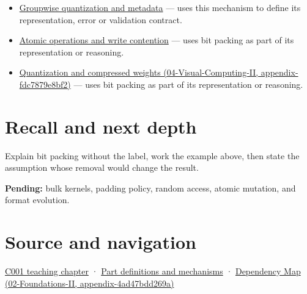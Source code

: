 \begin{itemize}
\item
  \hyperref[appendix-638204c40e8b]{Groupwise quantization and metadata} --- uses this mechanism to define its representation, error or validation contract.
\item
  \hyperref[appendix-e12d1b03fefb]{Atomic operations and write contention} --- uses bit packing as part of its representation or reasoning.
\item
  \href{../04-Visual-Computing-II/main.pdf\#nameddest=appendix-fdc7879e8bf2}{Quantization and compressed weights (04-Visual-Computing-II, appendix-fdc7879e8bf2)} --- uses bit packing as part of its representation or reasoning.
\end{itemize}

\section{Recall and next depth}\label{appendix-1f9963e1a5d1-recall-and-next-depth}

Explain bit packing without the label, work the example above, then state the assumption whose removal would change the result.

\textbf{Pending:} bulk kernels, padding policy, random access, atomic mutation, and format evolution.

\section{Source and navigation}\label{appendix-1f9963e1a5d1-source-and-navigation}

\href{Continuous\%20Notes/Computing\%20Foundations\%20-\%20From\%20Bits\%20to\%20C++\%20and\%20Systems\%20APIs\#From\%20a\%20signal\%20to\%20an\%20interpretation}{C001 teaching chapter} · \hyperref[appendix-fd090d982a15]{Part definitions and mechanisms} · \href{../02-Foundations-II/main.pdf\#nameddest=appendix-4ad47bdd269a}{Dependency Map (02-Foundations-II, appendix-4ad47bdd269a)}
